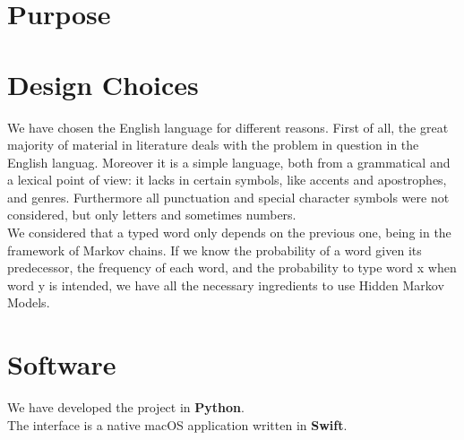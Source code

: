\section{Purpose}

\section{Design Choices}

We have chosen the English language for different reasons. First of all, the great majority of material in literature deals 
with the problem in question in the English languag. Moreover it is a simple language, both from a grammatical and a 
lexical point of view: it lacks in certain symbols, like accents and apostrophes, and genres. 
Furthermore all punctuation and special character symbols were not considered, but only letters and sometimes numbers. 
\\

We considered that a typed word only depends on the previous one, being 
in the framework of Markov chains. If we know the probability of a word 
given its predecessor, the frequency of each word, and the probability to 
type word x when word y is intended, we have all the necessary ingredients 
to use Hidden Markov Models.

\section{Software}
We have developed the project in \textbf{Python}.\\
The interface is a native macOS application written in \textbf{Swift}.
